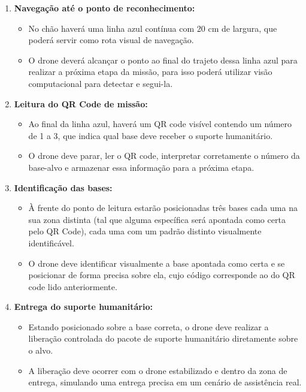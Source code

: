 \begin{itemize}
\begin{itemize}
\begin{enumerate}
            \item \textbf{Navegação até o ponto de reconhecimento:}
            \begin{itemize}
                \item No chão haverá uma linha azul contínua {\color{red} com 20 cm de largura}, que poderá servir como rota visual de navegação.
                \item {\color{red}O drone deverá alcançar o ponto ao final do trajeto dessa linha azul para realizar a próxima etapa da missão, para isso poderá utilizar visão computacional para detectar e segui-la.}
            \end{itemize}
            
            \item \textbf{Leitura do QR Code de missão:}
            \begin{itemize}
                \item Ao final da linha azul, haverá um QR code visível contendo um número de 1 a 3, que indica qual base deve receber o suporte humanitário.
                \item O drone deve parar, ler o QR code, interpretar corretamente o número da base-alvo e armazenar essa informação para a próxima etapa.
            \end{itemize}
            
            \item \textbf{Identificação das bases:}
            \begin{itemize}
                \item À frente do ponto de leitura estarão posicionadas três bases {\color{red}cada uma na sua zona distinta (tal que alguma específica será apontada como certa pelo QR Code), cada uma com um padrão distinto visualmente identificável.}
                \item {\color{red}O drone deve identificar visualmente a base apontada como certa e se posicionar de forma precisa sobre ela, cujo código corresponde ao do QR code lido anteriormente.}
            \end{itemize}
            
            \item \textbf{Entrega do suporte humanitário:}
            \begin{itemize}
                \item Estando posicionado sobre a base correta, o drone deve realizar a liberação controlada do pacote de suporte humanitário diretamente sobre o alvo.
                \item A liberação deve ocorrer com o drone estabilizado e dentro da zona de entrega, simulando uma entrega precisa em um cenário de assistência real.
            \end{itemize}
            

\end{enumerate}
\end{itemize}
\end{itemize}
